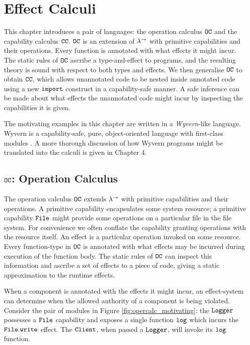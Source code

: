 \chapter{Effect Calculi}

This chapter introduces a pair of languages: the operation calculus $\mathtt{OC}$ and the capability calculus $\mathtt{CC}$. $\mathtt{OC}$ is an extension of $\lambda^{\rightarrow}$ with primitive capabilities and their operations. Every function is annotated with what effects it might incur. The static rules of $\mathtt{OC}$ ascribe a type-and-effect to programs, and the resulting theory is sound with respect to both types and effects. We then generalise $\mathtt{OC}$ to obtain $\mathtt{CC}$, which allows unannotated code to be nested inside annotated code using a new $\mathtt{import}$ construct in a capability-safe manner. A safe inference can be made about what effects the unannotated code might incur by inspecting the capabilities it is given.

The motivating examples in this chapter are written in a \textit{Wyvern}-like language. Wyvern is a capability-safe, pure, object-oriented language with first-class modules \cite{nistor13}. A more thorough discussion of how Wyvern programs might be translated into the calculi is given in Chapter 4.

\section{$\mathtt{OC}$: Operation Calculus}

The operation calculus $\mathtt{OC}$ extends $\lambda^{\rightarrow}$ with primitive capabilities and their operations. A primitive capability encapsulates some system resource; a primitive capability $\mathtt{File}$ might provide some operations on a particular file in the file system. For convenience we often conflate the capability granting operations with the resource itself. An effect is a particular operation invoked on some resource. Every function-type in $\mathtt{OC}$ is annotated with what effects may be incurred during execution of the function body. The static rules of $\mathtt{OC}$ can inspect this information and ascribe a set of effects to a piece of code, giving a static approximation to the runtime effects.

When a component is annotated with the effects it might incur, an effect-system can determine when the allowed 	authority of a component is being violated. Consider the pair of modules in Figure \ref{fig:opercalc_motivating}: the $\mathtt{Logger}$ possesses a $\mathtt{File}$ capability and exposes a single function $\mathtt{log}$ which incurs the $\mathtt{File.write}$ effect. The $\mathtt{Client}$, when passed a $\mathtt{Logger}$, will invoke its $\mathtt{log}$ function.



